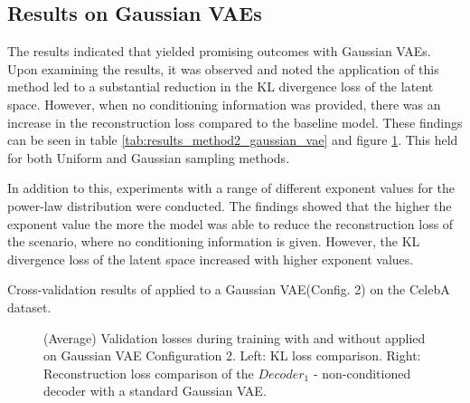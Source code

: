 
\subsection{Results on Gaussian VAEs}

The results indicated that  yielded promising outcomes with Gaussian VAEs. Upon examining the results, it was observed and noted the application of this method led to a substantial reduction in the KL divergence loss of the latent space. However, when no conditioning information was provided, there was an increase in the reconstruction loss compared to the baseline model. These findings can be seen in table \ref{tab:results_method2_gaussian_vae} and figure \ref{fig:results_method2_gaussian_vae}. This held for both Uniform and Gaussian sampling methods.

In addition to this, experiments with a range of different exponent values for the power-law distribution were conducted. The findings showed that the higher the exponent value the more the model was able to reduce the reconstruction loss of the scenario, where no conditioning information is given. However, the KL divergence loss of the latent space increased with higher exponent values.


\begin{table}[H]
    \centering
    
    \caption{Cross-validation results of  applied to a Gaussian VAE(Config. 2) on the CelebA dataset.}
    \label{tab:results_method2_gaussian_vae}
\end{table}

\begin{figure}[H]
    \centering
    \scalebox{0.48}{}
    \scalebox{0.48}{}
    \caption[Validation loss during training with  applied on Gaussian VAE.]
    {
        (Average) Validation losses during training with and without  applied on Gaussian VAE Configuration 2.
        Left: KL loss comparison. Right: Reconstruction loss comparison of the $Decoder_1$ - non-conditioned decoder with a standard Gaussian VAE.
    }
    \label{fig:results_method2_gaussian_vae}
\end{figure}

